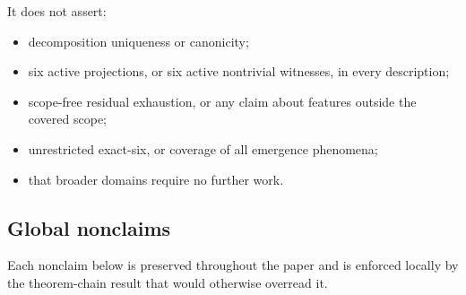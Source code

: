 It does not assert:
\begin{itemize}[topsep=2pt,itemsep=1pt]
  \item decomposition uniqueness or canonicity;
  \item six active projections, or six active nontrivial witnesses, in
    every description;
  \item scope-free residual exhaustion, or any claim about features
    outside the covered scope;
  \item unrestricted exact-six, or coverage of all emergence
    phenomena;
  \item that broader domains require no further work.
\end{itemize}

\subsection{Global nonclaims}\label{subsec:global-nonclaims}

Each nonclaim below is preserved throughout the paper and is enforced
locally by the theorem-chain result that would otherwise overread it.

